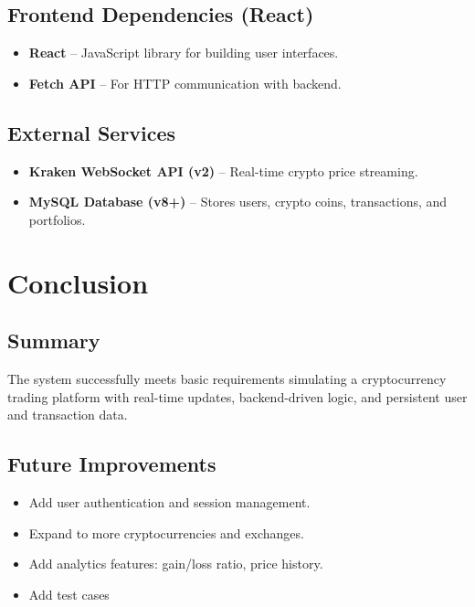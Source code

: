 \documentclass[a4paper,12pt]{article}
\begin{document}
\subsection{Frontend Dependencies (React)}
\begin{itemize}[label=-, itemsep=0.2em]
    \item \textbf{React} – JavaScript library for building user interfaces.
    \item \textbf{Fetch API} – For HTTP communication with backend.
\end{itemize}

\subsection{External Services}
\begin{itemize}[label=-, itemsep=0.2em]
    \item \textbf{Kraken WebSocket API (v2)} – Real-time crypto price streaming.
    \item \textbf{MySQL Database (v8+)} – Stores users, crypto coins, transactions, and portfolios.
\end{itemize}


\section{Conclusion}
\subsection{Summary}
The system successfully meets basic requirements simulating a cryptocurrency trading platform with real-time updates, backend-driven logic, and persistent user and transaction data.

\subsection{Future Improvements}
\begin{itemize}
    \item Add user authentication and session management.
    \item Expand to more cryptocurrencies and exchanges.
    \item Add analytics features: gain/loss ratio, price history.
    \item Add test cases
\end{itemize}
\end{document}
